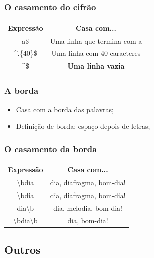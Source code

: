 \begin{frame}
	\frametitle{O casamento do cifrão}

	\begin{center}
	\begin{tabular}{c|c}
		\textbf{Expressão} & \textbf{Casa com...} \\ \hline
		a\$		& Uma linha que termina com a \\ \hline
		\textasciicircum .\{40\}\$ & Uma linha com 40 caracteres \\ \hline
		\textasciicircum \$ & \textbf{Uma linha vazia}		\\ \hline
	\end{tabular}
	\end{center}

\end{frame}
\begin{frame}
	\frametitle{A borda}

	\begin{itemize}
		\item Casa com a borda das palavras;
		\item Definição de borda: espaço depois de letras;
	\end{itemize}
\end{frame}

\begin{frame}
	\frametitle{O casamento da borda}
	\begin{center}
	\begin{tabular}{c|c}
		\textbf{Expressão} & \textbf{Casa com...} \\ \hline
		\textbackslash bdia & dia, diafragma, bom-dia! \\ \hline
		\textbackslash bdia & dia, diafragma, bom-dia! \\ \hline
		dia\textbackslash b & dia, melodia, bom-dia! \\ \hline
		\textbackslash bdia\textbackslash b& dia, bom-dia! \\ \hline
	\end{tabular}
	\end{center}
	
\end{frame}


\subsection{Outros}

